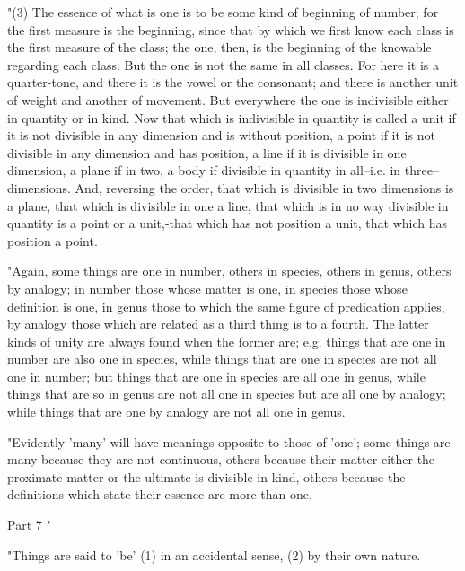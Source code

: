 "(3) The essence of what is one is to be some kind of beginning of
number; for the first measure is the beginning, since that by which
we first know each class is the first measure of the class; the one,
then, is the beginning of the knowable regarding each class. But the
one is not the same in all classes. For here it is a quarter-tone,
and there it is the vowel or the consonant; and there is another unit
of weight and another of movement. But everywhere the one is indivisible
either in quantity or in kind. Now that which is indivisible in quantity
is called a unit if it is not divisible in any dimension and is without
position, a point if it is not divisible in any dimension and has
position, a line if it is divisible in one dimension, a plane if in
two, a body if divisible in quantity in all--i.e. in three--dimensions.
And, reversing the order, that which is divisible in two dimensions
is a plane, that which is divisible in one a line, that which is in
no way divisible in quantity is a point or a unit,-that which has
not position a unit, that which has position a point. 

"Again, some things are one in number, others in species, others in
genus, others by analogy; in number those whose matter is one, in
species those whose definition is one, in genus those to which the
same figure of predication applies, by analogy those which are related
as a third thing is to a fourth. The latter kinds of unity are always
found when the former are; e.g. things that are one in number are
also one in species, while things that are one in species are not
all one in number; but things that are one in species are all one
in genus, while things that are so in genus are not all one in species
but are all one by analogy; while things that are one by analogy are
not all one in genus. 

"Evidently 'many' will have meanings opposite to those of 'one'; some
things are many because they are not continuous, others because their
matter-either the proximate matter or the ultimate-is divisible in
kind, others because the definitions which state their essence are
more than one. 

Part 7 "

"Things are said to 'be' (1) in an accidental sense, (2) by their
own nature. 

